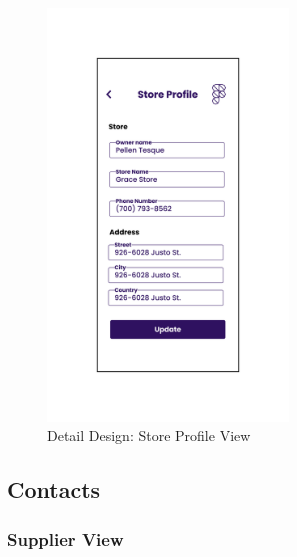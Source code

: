 \documentclass[../thesis.tex]{subfiles}
\begin{document}
\begin{figure}[H]
    \centering
    \includegraphics[width=0.57\textwidth]{images/DetailedDesign_StoreProfile.png}
    \caption{Detail Design: Store Profile View}
    \label{fig:DetailedDesign_StoreProfile}
\end{figure}

\subsection{Contacts}
\subsubsection{Supplier View}
\end{document}
